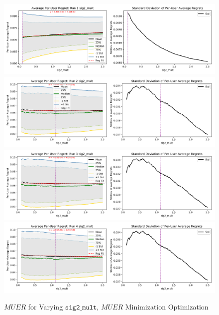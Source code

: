 	\begin{figure}[H]
	\includegraphics[width=1.1\textwidth,center]{figures/opt_param/opt_param_11100_sig2_mult1.png}%
	\newline
	\includegraphics[width=1.1\textwidth,center]{figures/opt_param/opt_param_11100_sig2_mult2.png}%
	\newline
	\includegraphics[width=1.1\textwidth,center]{figures/opt_param/opt_param_11100_sig2_mult3.png}%
	\newline
	\includegraphics[width=1.1\textwidth,center]{figures/opt_param/opt_param_11100_sig2_mult4.png}%
	\caption{$MUER$ for Varying $\mathtt{sig2\_mult}$, $MUER$ Minimization Optimization}
	\end{figure}

